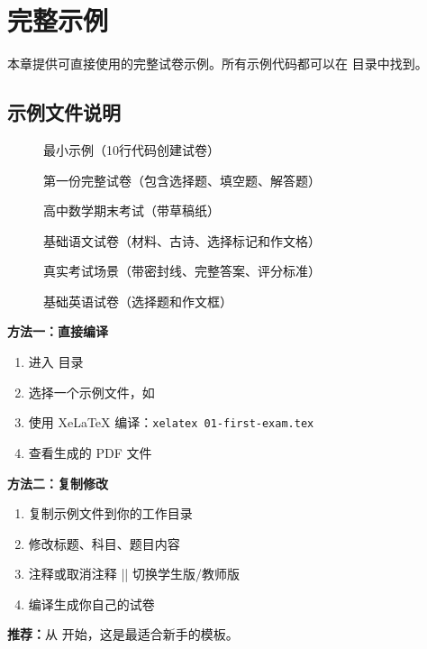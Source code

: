 
\section{完整示例}

本章提供可直接使用的完整试卷示例。所有示例代码都可以在  目录中找到。

\subsection{示例文件说明}

\begin{description}
  \item[] 最小示例（10行代码创建试卷）
  \item[] 第一份完整试卷（包含选择题、填空题、解答题）
  \item[] 高中数学期末考试（带草稿纸）
  \item[] 基础语文试卷（材料、古诗、选择标记和作文格）
  \item[] 真实考试场景（带密封线、完整答案、评分标准）
  \item[] 基础英语试卷（选择题和作文框）
\end{description}

\begin{tcolorbox}[colback=blue!5!white, colframe=blue!75!black, title=\textbf{如何使用这些示例}]
\textbf{方法一：直接编译}
\begin{enumerate}
  \item 进入  目录
  \item 选择一个示例文件，如 
  \item 使用 XeLaTeX 编译：\texttt{xelatex 01-first-exam.tex}
  \item 查看生成的 PDF 文件
\end{enumerate}

\textbf{方法二：复制修改}
\begin{enumerate}
  \item 复制示例文件到你的工作目录
  \item 修改标题、科目、题目内容
  \item 注释或取消注释 |\examsetup| 切换学生版/教师版
  \item 编译生成你自己的试卷
\end{enumerate}

\textbf{推荐：}从  开始，这是最适合新手的模板。
\end{tcolorbox}

